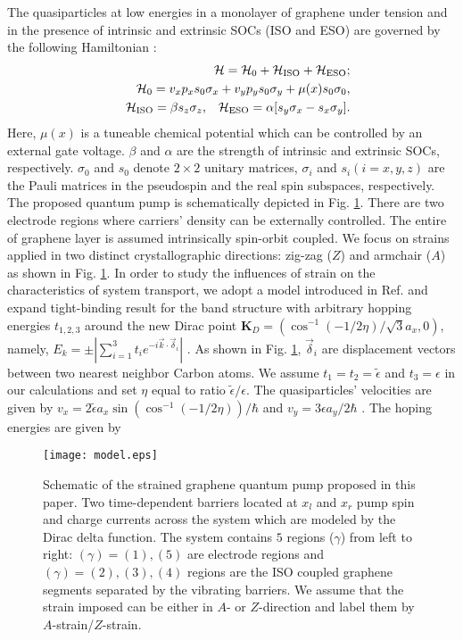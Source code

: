 \documentclass[doublecol]{epl2}
\begin{document}
The quasiparticles at low energies in a monolayer of graphene under
tension and in the presence of intrinsic and extrinsic SOCs (ISO and
ESO) are governed by the following Hamiltonian
\cite{cite:Bercioux,Kane05}:
%
\begin{eqnarray}\label{eq:hamil1}
&&{\cal H}= {\cal H}_0 + {\cal H}_{\text{ISO}}+{\cal
H}_{\text{ESO}};\\
&&{\cal H}_0= v_xp_x s_0\sigma_x
+v_yp_y s_0\sigma_y+{
\mu}(x) s_0\sigma_0,\nonumber\\
&&{\cal H}_{\text{ISO}}=\beta s_z\sigma_z,\;\;\; {\cal
H}_{\text{ESO}}=\alpha[s_y\sigma_x-s_x\sigma_y].\nonumber
\end{eqnarray}
Here, $\mu(x)$ is a tuneable chemical potential which can be
controlled by an external gate voltage. $\beta$ and $\alpha$ are the
strength of intrinsic and extrinsic SOCs, respectively. $\sigma_0$
and $s_0$ denote $2\times 2$ unitary matrices, $\sigma_i$ and $s_i
(i={x,y,z})$ are the Pauli matrices in the pseudospin and the real
spin subspaces, respectively. The proposed quantum pump is
schematically depicted in Fig. \ref{fig:model}. There are two
electrode regions where carriers' density can be externally
controlled. The entire of graphene layer is assumed intrinsically
spin-orbit coupled. We focus on strains applied in two distinct
crystallographic directions: zig-zag ($Z$) and armchair ($A$) as
shown in Fig. \ref{fig:model}. In order to study the influences of
strain on the characteristics of system transport, we adopt a model
introduced in Ref. \cite{cite:Pereira} and expand tight-binding
result for the band structure with arbitrary hopping energies
$t_{1,2,3}$ around the new Dirac point
$\mathbf{K}_D=(\cos^{-1}(-1/2\eta)/\sqrt{3}a_x,0)$, namely,
$E_k=\pm| \sum_{i=1}^{3}t_ie^{-i\vec{k}\cdot\vec{\delta}_{i}}|$
\cite{cite:choi1,cite:soodchomshom}. As shown in Fig.
\ref{fig:model}, $\vec{\delta}_{i}$ are displacement vectors between
two nearest neighbor Carbon atoms. We assume
$t_{1}=t_{2}=\tilde{\epsilon}$ and $t_3=\epsilon$ in our
calculations and set $\eta$ equal to ratio
$\tilde{\epsilon}/\epsilon$. The quasiparticles' velocities are
given by $v_x=2\tilde{\epsilon}a_x\sin(\cos^{-1}(-1/2\eta))/\hbar$
and $v_y=3\epsilon a_y/2\hbar$ \cite{cite:choi1,cite:soodchomshom}.
The hoping energies are given by
\begin{figure}
\centerline{\texttt{[image: model.eps]}} \caption{\label{fig:model} Schematic of the strained
graphene quantum pump proposed in this paper. Two time-dependent barriers located at $x_l$ and $x_r$ pump spin
and charge currents across the system which are modeled by the Dirac delta function. The system contains $5$
regions ($\gamma$) from left to right: $(\gamma)=(1),(5)$ are electrode regions and $(\gamma)=(2),(3),(4)$
regions are the ISO coupled graphene segments separated by the vibrating barriers. We assume that the strain
imposed can be either in $A$- or $Z$-direction and label them by $A$-strain/$Z$-strain.}
\end{figure}
\end{document}
